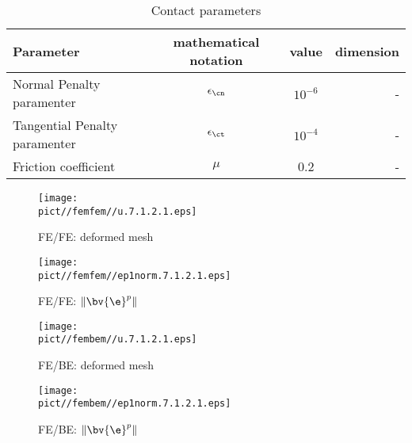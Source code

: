 \begin{table}[h]
\begin{tabular}{lccr}
Parameter                                     & mathematical notation                                       & value                 & dimension\\
\hline
Normal Penalty paramenter                     & $\epsilon_{\cn}$                                         & $10^{-6}$             & -\\
Tangential Penalty paramenter                 & $\epsilon_{\ct}$                                         & $10^{-4}$               & -\\
Friction coefficient                          & $\mu$                                                    & 0.2                     & -
\end{tabular}
\caption{Contact parameters}\label{tb:Ex2:ContactParameters}
\end{table}
\begin{figure} [h!]
   \begin{minipage}{5.5cm}
   \begin{center}
\vspace*{5mm}
     \texttt{[image: \\pict//femfem//u.7.1.2.1.eps]}
\caption{ \label{fig:ElPlContEx1ffnet}  FE/FE: deformed mesh}
   \end{center}
   \end{minipage}
 \hspace*{20mm}
   \begin{minipage}{5.5cm}
   \begin{center}
     \texttt{[image: \\pict//femfem//ep1norm.7.1.2.1.eps]}
\caption{ \label{fig:ElPlContEx1ffdev}  FE/FE: $\|\bv{\e}^p\|$ }
   \end{center}
   \end{minipage}

   \begin{minipage}{5.5cm}
   \begin{center}
\vspace*{5mm}
     \texttt{[image: \\pict//fembem//u.7.1.2.1.eps]}
\caption{ \label{fig:ElPlContEx1fbnet}  FE/BE: deformed mesh}
   \end{center}
   \end{minipage}
 \hspace*{20mm}
   \begin{minipage}{5.5cm}
   \begin{center}
     \texttt{[image: \\pict//fembem//ep1norm.7.1.2.1.eps]}
\caption{ \label{fig:ElPlContEx1fbdev}  FE/BE: $\|\bv{\e}^p\|$ }
   \end{center}
   \end{minipage}
\end{figure}

